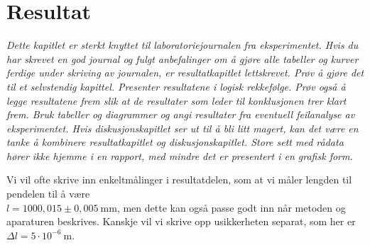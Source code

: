 \documentclass[5p]{elsarticle}
\newcommand{\enhet}[1]{~\mathrm{#1}}  %
\begin{document}
\section{Resultat}

\textit{
Dette kapitlet er sterkt knyttet til laboratoriejournalen fra eksperimentet. Hvis du har skrevet en god journal og
fulgt anbefalinger om å gjøre alle tabeller og kurver ferdige under skriving av journalen, er resultatkapitlet lettskrevet. 
Prøv å gjøre det til et selvstendig kapittel. Presenter resultatene i logisk rekkefølge. Prøv også å legge resultatene frem
slik at de resultater som leder til konklusjonen trer klart frem. Bruk tabeller og diagrammer og angi resultater fra
eventuell feilanalyse av eksperimentet.  Hvis diskusjonskapitlet ser ut til å bli litt magert, kan det være en tanke å
kombinere resultatkapitlet og diskusjonskapitlet. Store sett med rådata hører ikke hjemme i en rapport, med mindre det er
presentert i en grafisk form.
}

Vi vil ofte skrive inn enkeltmålinger i resultatdelen, som at vi måler lengden til pendelen til å være\\
$l = 1000,015\pm0,005\enhet{mm}$, men dette kan også passe godt inn når metoden og aparaturen beskrives.
Kanskje vil vi skrive opp usikkerheten separat, som her er $\Delta l = 5\cdot 10^{-6}\enhet{m}$.
\end{document}
